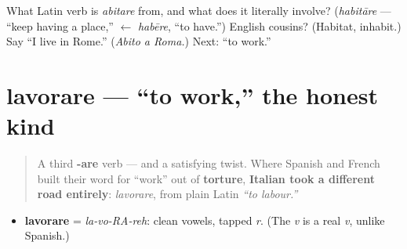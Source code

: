 \begin{tcolorbox}[breakable,colback=teal!4,colframe=teal!35!black,title={Before you move on}]
What Latin verb is \emph{abitare} from, and what does it literally involve? (\emph{habitāre} — \textquotedblleft{}keep having a place,\textquotedblright{} $\leftarrow$ \emph{habēre}, \textquotedblleft{}to have.\textquotedblright{}) English cousins? (Habitat, inhabit.) Say \textquotedblleft{}I live in Rome.\textquotedblright{} (\emph{Abito a Roma.}) Next: \textquotedblleft{}to work.\textquotedblright{}
\end{tcolorbox}
\section[lavorare]{lavorare — \textquotedblleft{}to work,\textquotedblright{} the honest kind}

\label{lesson:IT-C05-lavorare}



\begin{quote}
A third \textbf{-are} verb — and a satisfying twist. Where Spanish and French built their word for \textquotedblleft{}work\textquotedblright{} out of \textbf{torture}, \textbf{Italian took a different road entirely}: \emph{lavorare}, from plain Latin \emph{\textquotedblleft{}to labour.\textquotedblright{}}
\end{quote}

\begin{sounds}
\begin{itemize}
\raggedright
  \item \textbf{lavorare} = \emph{la-vo-RA-reh}: clean vowels, tapped \emph{r}. (The \emph{v} is a real \emph{v}, unlike Spanish.)
\end{itemize}
\end{sounds}

